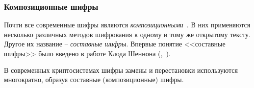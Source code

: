 \subsubsection{Композиционные шифры}

Почти все современные шифры являются \emph{композиционными}~\cite{AlZKCh:2001}. В них применяются несколько различных методов шифрования к одному и тому же открытому тексту. Другое их название -- \emph{составные шифры}. Впервые понятие <<составные шифры>> было введено в работе Клода Шеннона (,~\cite{Shannon:1949:CTS}).

В современных криптосистемах шифры замены и перестановки используются многократно, образуя составные (композиционные) шифры.
